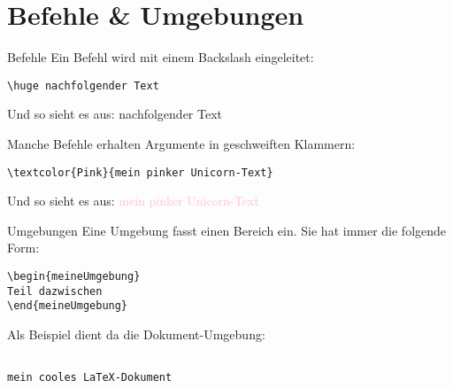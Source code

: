 \section{Befehle \& Umgebungen}
\begin{frame}[fragile]{Befehle}
Ein Befehl wird mit einem Backslash eingeleitet:

\begin{lstlisting}[style=tex]
\huge nachfolgender Text\end{lstlisting}

\pause Und so sieht es aus: {\huge nachfolgender Text}

\vspace{2ex}
\pause Manche Befehle erhalten Argumente in geschweiften Klammern:
\begin{lstlisting}[style=tex]
\textcolor{Pink}{mein pinker Unicorn-Text}\end{lstlisting}

\pause Und so sieht es aus: \textcolor{Pink}{mein pinker Unicorn-Text}
\end{frame}

\begin{frame}[fragile]{Umgebungen}
Eine Umgebung fasst einen Bereich ein. Sie hat immer die folgende Form:

\begin{lstlisting}[style=tex]
\begin{meineUmgebung}
Teil dazwischen
\end{meineUmgebung}\end{lstlisting}

\pause Als Beispiel dient da die Dokument-Umgebung:

\begin{lstlisting}[style=tex]

mein cooles LaTeX-Dokument
\end{lstlisting}
\end{frame}